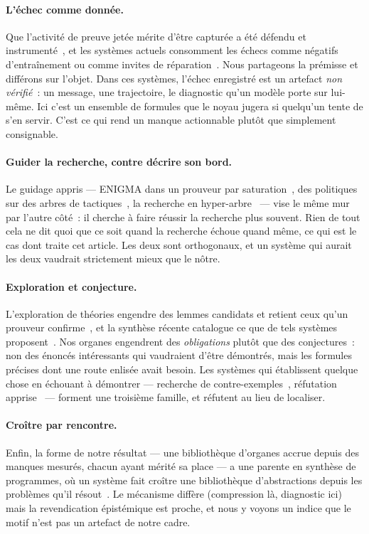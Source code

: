\documentclass[11pt]{article}
\theoremstyle{remark}\newtheorem{remarque}{Remarque}
\begin{document}
\paragraph{L'échec comme donnée.} Que l'activité de preuve jetée mérite d'être capturée a
été défendu et instrumenté~\cite{ringer2020replica}, et les systèmes actuels consomment
les échecs comme négatifs d'entraînement ou comme invites de
réparation~\cite{first2023baldur}. Nous partageons la prémisse et différons sur l'objet.
Dans ces systèmes, l'échec enregistré est un artefact \emph{non vérifié}~: un message,
une trajectoire, le diagnostic qu'un modèle porte sur lui-même. Ici c'est un ensemble de
formules que le noyau jugera si quelqu'un tente de s'en servir. C'est ce qui rend un
manque actionnable plutôt que simplement consignable.

\paragraph{Guider la recherche, contre décrire son bord.} Le guidage appris --- ENIGMA
dans un prouveur par saturation~\cite{jakubuv2020enigma}, des politiques sur des arbres
de tactiques~\cite{yang2019coqgym,polu2020gptf}, la recherche en
hyper-arbre~\cite{lample2022htps} --- vise le même mur par l'autre côté~: il cherche à
faire réussir la recherche plus souvent. Rien de tout cela ne dit quoi que ce soit quand
la recherche échoue quand même, ce qui est le cas dont traite cet article. Les deux sont
orthogonaux, et un système qui aurait les deux vaudrait strictement mieux que le nôtre.

\paragraph{Exploration et conjecture.} L'exploration de théories engendre des lemmes
candidats et retient ceux qu'un prouveur confirme~\cite{johansson2014hipster}, et la
synthèse récente catalogue ce que de tels systèmes proposent~\cite{conjecturingsurvey2026}.
Nos organes engendrent des \emph{obligations} plutôt que des conjectures~: non des
énoncés intéressants qui vaudraient d'être démontrés, mais les formules précises dont une
route enlisée avait besoin. Les systèmes qui établissent quelque chose en échouant à
démontrer --- recherche de contre-exemples~\cite{blanchette2011nitpick}, réfutation
apprise~\cite{learningtodisprove2026} --- forment une troisième famille, et réfutent au
lieu de localiser.

\paragraph{Croître par rencontre.} Enfin, la forme de notre résultat --- une bibliothèque
d'organes accrue depuis des manques mesurés, chacun ayant mérité sa place --- a une
parente en synthèse de programmes, où un système fait croître une bibliothèque
d'abstractions depuis les problèmes qu'il résout~\cite{ellis2021dreamcoder}. Le mécanisme
diffère (compression là, diagnostic ici) mais la revendication épistémique est proche, et
nous y voyons un indice que le motif n'est pas un artefact de notre cadre.
\end{document}
